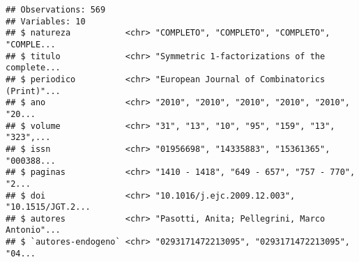 \documentclass[]{article}
\newenvironment{Shaded}{\begin{snugshade}}{\end{snugshade}}
\newcommand{\KeywordTok}[1]{\textcolor[rgb]{0.13,0.29,0.53}{\textbf{#1}}}
\newcommand{\DataTypeTok}[1]{\textcolor[rgb]{0.13,0.29,0.53}{#1}}
\newcommand{\CharTok}[1]{\textcolor[rgb]{0.31,0.60,0.02}{#1}}
\newcommand{\StringTok}[1]{\textcolor[rgb]{0.31,0.60,0.02}{#1}}
\newcommand{\CommentTok}[1]{\textcolor[rgb]{0.56,0.35,0.01}{\textit{#1}}}
\newcommand{\OperatorTok}[1]{\textcolor[rgb]{0.81,0.36,0.00}{\textbf{#1}}}
\newcommand{\NormalTok}[1]{#1}
\begin{document}
\begin{Shaded}
\end{Shaded}

\begin{verbatim}
## Observations: 569
## Variables: 10
## $ natureza           <chr> "COMPLETO", "COMPLETO", "COMPLETO", "COMPLE...
## $ titulo             <chr> "Symmetric 1-factorizations of the complete...
## $ periodico          <chr> "European Journal of Combinatorics (Print)"...
## $ ano                <chr> "2010", "2010", "2010", "2010", "2010", "20...
## $ volume             <chr> "31", "13", "10", "95", "159", "13", "323",...
## $ issn               <chr> "01956698", "14335883", "15361365", "000388...
## $ paginas            <chr> "1410 - 1418", "649 - 657", "757 - 770", "2...
## $ doi                <chr> "10.1016/j.ejc.2009.12.003", "10.1515/JGT.2...
## $ autores            <chr> "Pasotti, Anita; Pellegrini, Marco Antonio"...
## $ `autores-endogeno` <chr> "0293171472213095", "0293171472213095", "04...
\end{verbatim}
\end{document}
